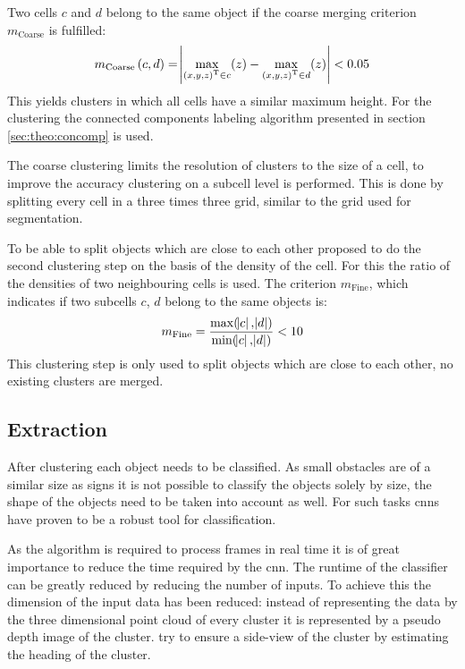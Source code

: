 Two cells $c$ and $d$ belong to the same object if the coarse merging criterion $m_\text{Coarse}$ is fulfilled:
\begin{equation}
    m_\text{Coarse}\,  (c,d) = \abs{ \max_{{(x,y,z)}^\text{T} \in c}(z) - \max_{{(x,y,z)}^\text{T} \in d}(z) } < 0.05
\end{equation}
This yields clusters in which all cells have a similar maximum height. For the clustering the connected components labeling algorithm presented in section \ref{sec:theo:concomp} is used.

The coarse clustering limits the resolution of clusters to the size of a cell, to improve the accuracy clustering on a subcell level is performed. This is done by splitting every cell in a three times three grid, similar to the grid used for segmentation.

To be able to split objects which are close to each other \cite{AttBen14} proposed to do the second clustering step on the basis of the density of the cell. 
For this the ratio of the densities of two neighbouring cells is used. 
The criterion $m_\text{Fine}$, which indicates if two subcells $c$, $d$ belong to the same objects is:
\begin{equation}
    m_\text{Fine} = \frac{\max(\abs{c}, \abs{d})}{\min(\abs{c}, \abs{d})} < 10 
\end{equation}
This clustering step is only used to split objects which are close to each other, no existing clusters are merged.

\subsection{Extraction} \label{sec:det:originalExtraction}
After clustering each object needs to be classified. 
As small obstacles are of a similar size as signs it is not possible to classify the objects solely by size, the shape of the objects need to be taken into account as well. 
For such tasks \ac{cnn}s have proven to be a robust tool for classification.

As the algorithm is required to process frames in real time it is of great importance to reduce the time required by the \ac{cnn}.
The runtime of the classifier can be greatly reduced by reducing the number of inputs.
To achieve this the dimension of the input data has been reduced: instead of representing the data by the three dimensional point cloud of every cluster it is represented by a pseudo depth image of the cluster. \cite{AttBen17} try to ensure a side-view of the cluster by estimating the heading of the cluster.

